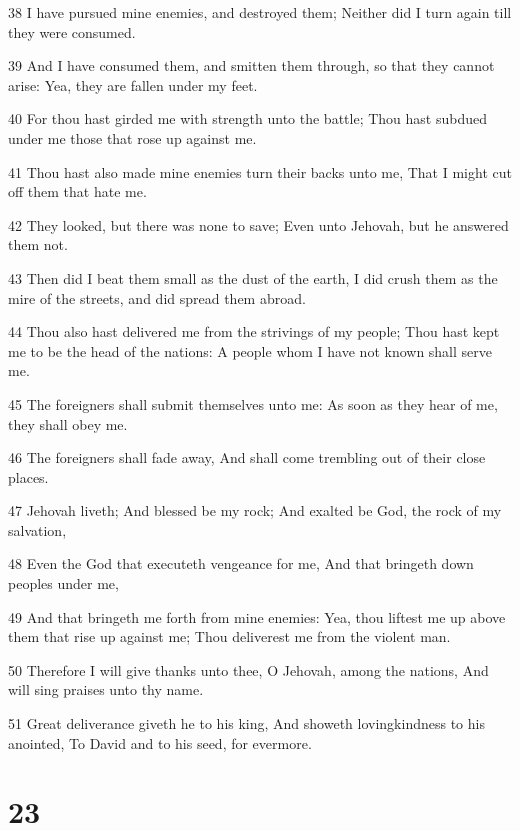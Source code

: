 \par 38 I have pursued mine enemies, and destroyed them; Neither did I turn again till they were consumed.
\par 39 And I have consumed them, and smitten them through, so that they cannot arise: Yea, they are fallen under my feet.
\par 40 For thou hast girded me with strength unto the battle; Thou hast subdued under me those that rose up against me.
\par 41 Thou hast also made mine enemies turn their backs unto me, That I might cut off them that hate me.
\par 42 They looked, but there was none to save; Even unto Jehovah, but he answered them not.
\par 43 Then did I beat them small as the dust of the earth, I did crush them as the mire of the streets, and did spread them abroad.
\par 44 Thou also hast delivered me from the strivings of my people; Thou hast kept me to be the head of the nations: A people whom I have not known shall serve me.
\par 45 The foreigners shall submit themselves unto me: As soon as they hear of me, they shall obey me.
\par 46 The foreigners shall fade away, And shall come trembling out of their close places.
\par 47 Jehovah liveth; And blessed be my rock; And exalted be God, the rock of my salvation,
\par 48 Even the God that executeth vengeance for me, And that bringeth down peoples under me,
\par 49 And that bringeth me forth from mine enemies: Yea, thou liftest me up above them that rise up against me; Thou deliverest me from the violent man.
\par 50 Therefore I will give thanks unto thee, O Jehovah, among the nations, And will sing praises unto thy name.
\par 51 Great deliverance giveth he to his king, And showeth lovingkindness to his anointed, To David and to his seed, for evermore.

\chapter{23}

